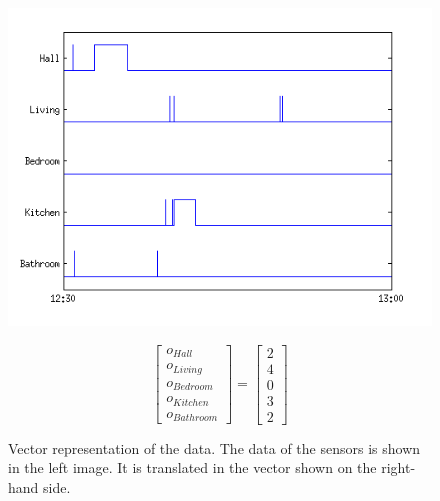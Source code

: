 \documentclass[11pt,a4paper]{article}
\begin{document}
\begin{figure}[h]
\centering
\begin{minipage}{0.55\linewidth}
\centering
\includegraphics[width=\textwidth]{Pictures/FeatExample.png}
\label{fig:FeatEx}
\end{minipage}
\begin{minipage}{0.35\linewidth}
\centering
\begin{equation*}
 \begin{bmatrix} 
 o_{Hall}\\
 o_{Living}\\
 o_{Bedroom}\\
 o_{Kitchen}\\
 o_{Bathroom}
 \end{bmatrix}
 =
  \begin{bmatrix} 
 2\\
 4\\
 0\\
 3\\
 2
 \end{bmatrix}
\end{equation*}
\end{minipage}
\caption{Vector representation of the data. The data of the sensors is shown in the left image. It is translated in the vector shown on the right-hand side.}
\end{figure}
\end{document}
